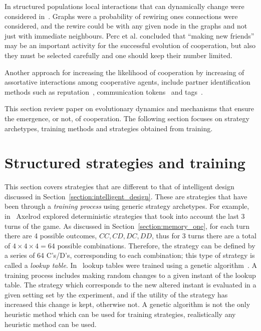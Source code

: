 In structured populations local interactions that can dynamically change were
considered in~\cite{Perc2011}. Graphs were a probability of rewiring ones
connections were considered, and the rewire could be with any given node in the
graphs and not just with immediate neighbours. Perc et al. concluded that
``making new friends'' may be an important activity for the successful evolution
of cooperation, but also they must be selected carefully and one should keep
their number limited.

Another approach for increasing the likelihood of cooperation by increasing of
assortative interactions among cooperative agents, include partner identification
methods such as reputation~\cite{Janssen2006, Nowak1998, Suzuki2005},
communication tokens~\cite{Miller2002} and tags~\cite{Choi2006, Hales2000,
Miller2002, Riolo2001}.

This section review paper on evolutionary dynamics and mechanisms that ensure
the emergence, or not, of cooperation. The following section focuses on strategy
archetypes, training methods and strategies obtained from training.

\section{Structured strategies and training}
\label{section:structured_strategies}

This section covers strategies that are different to that of intelligent design discussed
in Section~\ref{section:intelligent_design}. These are strategies that have
been through a \textit{training process} using generic strategy archetypes. For example,
in~\cite{Axelrod1987} Axelrod explored deterministic strategies that
took into account the last 3 turns of the game. As discussed in
Section~\ref{section:memory_one}, for each turn there are 4 possible outcomes,
\(CC, CD, DC, DD\), thus for 3 turns there are a total of
\(4\times4\times4=64\) possible combinations. Therefore, the strategy can be
defined by a series of 64 C's/D's, corresponding to each combination; this type
of strategy is called a \textit{lookup table}. In~\cite{Axelrod1987} lookup tables were trained using a
genetic algorithm~\cite{Koza1997}. A training process includes making random changes to
a given instant of the lookup table. The strategy which corresponds to the new altered
instant is evaluated in a given setting set by the experiment, and if the
utility of the strategy has increased this change is kept, otherwise not.
A genetic algorithm is not the only heuristic method which can be used for
training strategies, realistically any heuristic method can be used.

